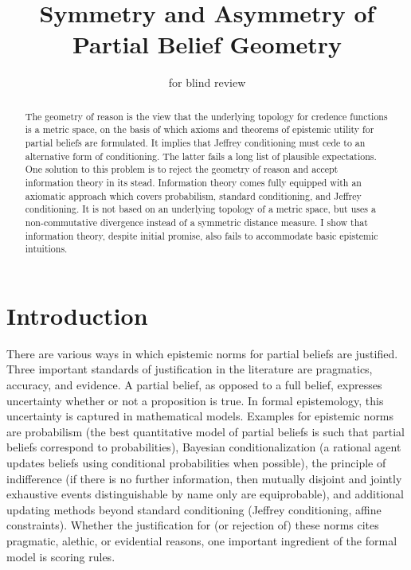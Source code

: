 \documentclass[12pt]{article}
\begin{document}

\title{Symmetry and Asymmetry of Partial Belief Geometry}
\author{for blind review}
\date{}
\maketitle

\begin{abstract}
  {\noindent}The geometry of reason is the view that the underlying
  topology for credence functions is a metric space, on the basis of
  which axioms and theorems of epistemic utility for partial beliefs
  are formulated. It implies that Jeffrey conditioning must cede to an
  alternative form of conditioning. The latter fails a long list of
  plausible expectations. One solution to this problem is to reject
  the geometry of reason and accept information theory in its stead.
  Information theory comes fully equipped with an axiomatic approach
  which covers probabilism, standard conditioning, and Jeffrey
  conditioning. It is not based on an underlying topology of a metric
  space, but uses a non-commutative divergence instead of a symmetric
  distance measure. I show that information theory, despite initial
  promise, also fails to accommodate basic epistemic intuitions.
\end{abstract}

\section{Introduction}
\label{intr}

There are various ways in which epistemic norms for partial
beliefs are justified. Three important standards of justification in
the literature are pragmatics, accuracy, and evidence. A partial
belief, as opposed to a full belief, expresses uncertainty whether or
not a proposition is true. In formal epistemology, this uncertainty is
captured in mathematical models. Examples for epistemic norms are
probabilism (the best quantitative model of partial beliefs is such
that partial beliefs correspond to probabilities), Bayesian
conditionalization (a rational agent updates beliefs using conditional
probabilities when possible), the principle of indifference (if there
is no further information, then mutually disjoint and jointly
exhaustive events distinguishable by name only are equiprobable), and
additional updating methods beyond standard conditioning (Jeffrey
conditioning, affine constraints). Whether the justification for (or
rejection of) these norms cites pragmatic, alethic, or evidential
reasons, one important ingredient of the formal model is scoring
rules.
\end{document}
